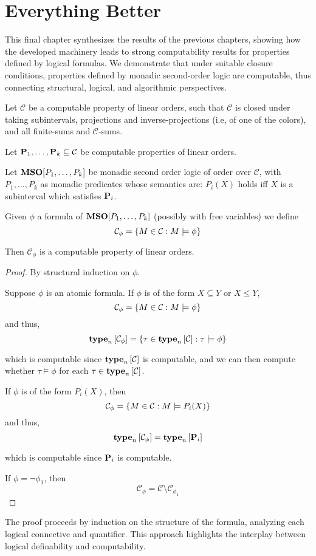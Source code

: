 \section{Everything Better}

This final chapter synthesizes the results of the previous chapters, showing how the developed machinery leads to strong computability results for properties defined by logical formulas. We demonstrate that under suitable closure conditions, properties defined by monadic second-order logic are computable, thus connecting structural, logical, and algorithmic perspectives.

\begin{theorem}
    Let $\mathcal{C}$ be a computable property of linear orders,
    such that $\mathcal{C}$ is closed under taking subintervals,
    projections and inverse-projections (i.e, of one of the colors), and all finite-sums and $\mathcal{C}$-sums.

    Let $\mathbf{P}_1, \ldots, \mathbf{P}_k \subseteq \mathcal{C}$ be
    computable properties of linear orders.

    Let $\mathbf{MSO}[P_1, \ldots, P_k]$ be monadic second order logic of order
    over $\mathcal{C}$,
    with $P_1, \ldots, P_k$ as monadic predicates whose semantics are:
    $P_i(X)$ holds iff $X$ is a subinterval which satisfies $\mathbf{P}_i$.

    Given $\phi$ a formula of $\mathbf{MSO}[P_1, \ldots, P_k]$ (possibly with free variables)
    we define \[ \mathcal{C}_{\phi} = \left\{ {M \in \mathcal{C} : M \models \phi} \right\} \]

    Then $\mathcal{C}_{\phi}$ is a computable property of linear orders.
\end{theorem}

\begin{proof}
    By structural induction on $\phi$.

    Suppose $\phi$ is an atomic formula.
    If $\phi$ is of the form $X \subseteq Y$ or $X \le Y$,
    \[
        \mathcal{C}_{\phi} = \left\{ {M \in \mathcal{C} : M \models \phi} \right\}
    \]
    and thus,
    \[
        \mathbf{type}_{n} \left[ {\mathcal{C}_{\phi}} \right] = \left\{ {\tau \in \mathbf{type}_{n} \left[ {\mathcal{C}} \right] : \tau \models \phi} \right\}
    \]

    which is computable since $\mathbf{type}_{n} \left[ {\mathcal{C}} \right]$ is computable,
    and we can then compute whether $\tau \models \phi$ for each $\tau \in \mathbf{type}_{n} \left[ {\mathcal{C}} \right]$.

    If $\phi$ is of the form $P_i(X)$,
    then
    \[
        \mathcal{C}_{\phi} = \left\{ {M \in \mathcal{C} : M \models P_i(X)} \right\}
    \]
    and thus,
    \[
        \mathbf{type}_{n} \left[ {\mathcal{C}_{\phi}} \right] = \mathbf{type}_{n} \left[ {\mathbf{P}_i} \right]
    \]

    which is computable since $\mathbf{P}_i$ is computable.

    If $\phi = \neg \phi_1$,
    then
    \[
        \mathcal{C}_{\phi} = \mathcal{C} \setminus \mathcal{C}_{\phi_1}
    \]

\end{proof}

The proof proceeds by induction on the structure of the formula, analyzing each logical connective and quantifier. This
approach highlights the interplay between logical definability and computability.
